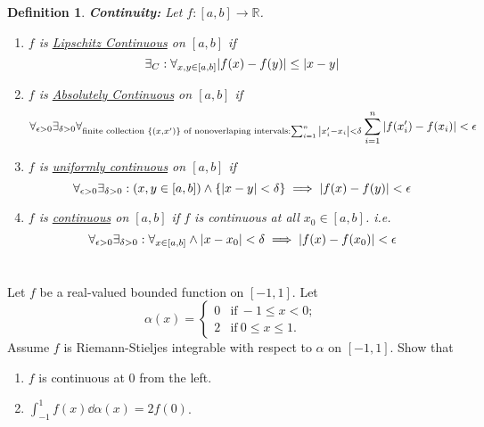 \documentclass[]{article}
\newcommand{\R}{\mathbb{R}}
\newtheorem{definition}{Definition}
\begin{document}
\begin{definition}
    \textbf{Continuity:}
    Let $f : [a,b] \to \R$. 
    \begin{enumerate}
        \item $f$ is \emph{\underline{Lipschitz Continuous}} on $[a,b]$ if \[
            \exists_{C} : \forall_{x,y \in [a,b]} \abs{f(x) - f(y)} \leq \abs{x - y} 
        \]
        \item $f$ is \emph{\underline{Absolutely Continuous}} on $[a,b]$ if \[
            \forall_{\epsilon>0} \exists_{\delta>0}
            \forall_{
                \text{finite collection } \qty{(x,x')} \text{ of nonoverlaping intervals} 
                : \sum_{i=1}^{n} \abs{x_i' - x_i} < \delta
            } \sum_{i=1}^{n} \abs{f(x_i') - f(x_i)} < \epsilon
        \]
        \item $f$ is \underline{\emph{uniformly continuous}} on $[a,b]$ if \[
            \forall_{\epsilon>0} \exists_{\delta>0} : 
                \qty(x,y \in [a,b]) \land \qty{\abs{x-y} < \delta}
            \implies \abs{f(x) - f(y)} < \epsilon
        \]
        \item $f$ is \emph{\underline{continuous}} on $[a,b]$ if $f$ is continuous at all $x_0 \in [a,b]$.
        i.e. \[
            \forall_{\epsilon > 0} \exists_{\delta>0} : 
            \forall_{x \in [a,b]} \land \abs{x - x_0} < \delta
            \implies \abs{f(x) - f(x_0)} < \epsilon
        \]
    \end{enumerate}
\end{definition}



\newpage
\section{}
Let $f$ be a real-valued bounded function on $[-1,1]$. 
Let\[
    \alpha(x) = \begin{cases}
        0 &\text{if} \ -1 \leq x < 0;\\
        2 &\text{if} \  0 \leq x \leq 1.
    \end{cases}
\]
Assume $f$ is Riemann-Stieljes integrable with respect to $\alpha$ on $[-1,1]$. 
Show that \begin{enumerate}
    \item $f$ is continuous at $0$ from the left.
    \item $\int_{-1}^{1} f(x) \dd{\alpha(x)} = 2 f(0)$.
\end{enumerate}
\end{document}
